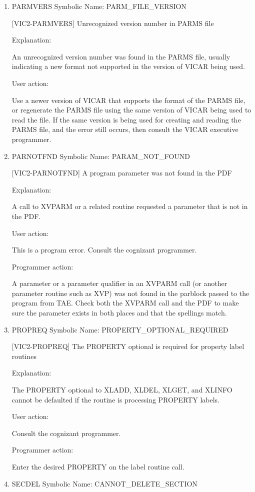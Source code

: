 \begin{enumerate}
\item PARMVERS Symbolic Name: PARM\_FILE\_VERSION

[VIC2-PARMVERS] Unrecognized version number in PARMS file

Explanation:

An unrecognized version number was found in the PARMS file,
usually indicating a new format not supported in the version
of VICAR being used.

User action:

Use a newer version of VICAR that supports the format of the
PARMS file, or regenerate the PARMS file using the same version
of VICAR being used to read the file.  If the same version is
being used for creating and reading the PARMS file, and the error
still occurs, then consult the VICAR executive programmer.


\item PARNOTFND Symbolic Name: PARAM\_NOT\_FOUND

[VIC2-PARNOTFND] A program parameter was not found in the PDF

Explanation:

A call to XVPARM or a related routine requested a parameter
that is not in the PDF.

User action:

This is a program error.  Consult the cognizant programmer.

Programmer action:

A parameter or a parameter qualifier in an XVPARM call (or
another parameter routine such as XVP) was not found in the
parblock passed to the program from TAE.  Check both the XVPARM
call and the PDF to make sure the parameter exists in both
places and that the spellings match.


\item PROPREQ Symbolic Name: PROPERTY\_OPTIONAL\_REQUIRED

[VIC2-PROPREQ] The PROPERTY optional is required for property label routines

Explanation:

The PROPERTY optional to XLADD, XLDEL, XLGET, and XLINFO cannot be
defaulted if the routine is processing PROPERTY labels.

User action:

Consult the cognizant programmer.

Programmer action:

Enter the desired PROPERTY on the label routine call.


\item SECDEL Symbolic Name: CANNOT\_DELETE\_SECTION


\end{enumerate}
